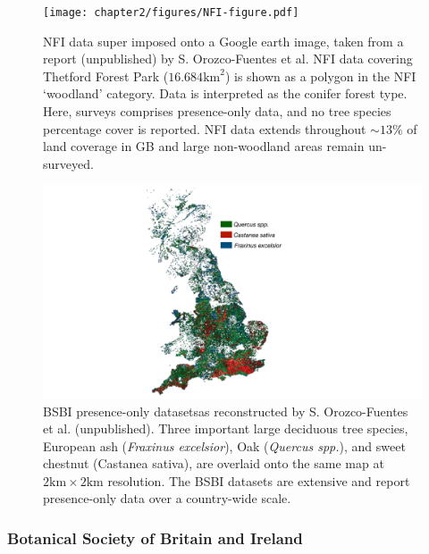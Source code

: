 \begin{figure}
    \centering
    \texttt{[image: chapter2/figures/NFI-figure.pdf]}
    \caption{NFI data super imposed onto a Google earth image, taken from a report (unpublished) by S. Orozco-Fuentes et al.
             NFI data covering Thetford Forest Park ($16.684 \mathrm{km}^2$) is shown as a polygon in the NFI `woodland' category.
             Data is interpreted as the conifer forest type. Here, surveys comprises presence-only data, and no tree species percentage cover
             is reported. NFI data extends throughout $\sim 13\%$ of land coverage in GB and large non-woodland areas remain un-surveyed.}
    \label{fig:NFI-data}
\end{figure}

\begin{figure}
    \centering
    \includegraphics[scale=0.25]{chapter2/figures/bsbi-data.pdf}
    \caption{BSBI presence-only datasets\textemdash as reconstructed by S. Orozco-Fuentes et al. (unpublished).
    Three important large deciduous tree species, European ash (\textit{Fraxinus excelsior}), 
    Oak (\textit{Quercus spp.}), and sweet chestnut (Castanea sativa), are overlaid onto the same map at $\mathrm{2km \times 2km}$ resolution.
    The BSBI datasets are extensive and report presence-only data over a country-wide scale.
    }
    \label{fig:bsbi-data}
\end{figure}

\subsubsection{Botanical Society of Britain and Ireland}

